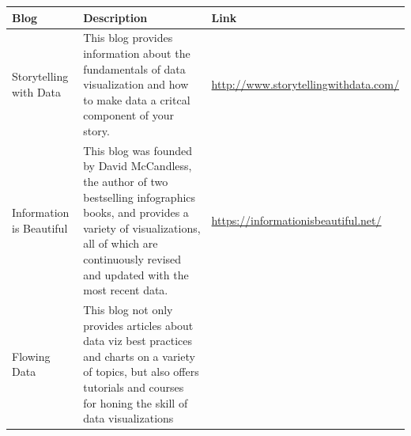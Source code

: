 \documentclass[]{book}
\theoremstyle{definition}
\theoremstyle{definition}
\theoremstyle{definition}
\theoremstyle{remark}
\begin{document}
\begin{longtable}[]{@{}lll@{}}
\toprule
\begin{minipage}[b]{0.11\columnwidth}\raggedright\strut
\textbf{Blog}\strut
\end{minipage} & \begin{minipage}[b]{0.20\columnwidth}\raggedright\strut
\textbf{Description}\strut
\end{minipage} & \begin{minipage}[b]{0.11\columnwidth}\raggedright\strut
\textbf{Link}\strut
\end{minipage}\tabularnewline
\midrule
\endhead
\begin{minipage}[t]{0.11\columnwidth}\raggedright\strut
Storytelling with Data\strut
\end{minipage} & \begin{minipage}[t]{0.20\columnwidth}\raggedright\strut
This blog provides information about the fundamentals of data
visualization and how to make data a critcal component of your
story.\strut
\end{minipage} & \begin{minipage}[t]{0.11\columnwidth}\raggedright\strut
\url{http://www.storytellingwithdata.com/}\strut
\end{minipage}\tabularnewline
\begin{minipage}[t]{0.11\columnwidth}\raggedright\strut
Information is Beautiful\strut
\end{minipage} & \begin{minipage}[t]{0.20\columnwidth}\raggedright\strut
This blog was founded by David McCandless, the author of two bestselling
infographics books, and provides a variety of visualizations, all of
which are continuously revised and updated with the most recent
data.\strut
\end{minipage} & \begin{minipage}[t]{0.11\columnwidth}\raggedright\strut
\url{https://informationisbeautiful.net/}\strut
\end{minipage}\tabularnewline
\begin{minipage}[t]{0.11\columnwidth}\raggedright\strut
Flowing Data\strut
\end{minipage} & \begin{minipage}[t]{0.20\columnwidth}\raggedright\strut
This blog not only provides articles about data viz best practices and
charts on a variety of topics, but also offers tutorials and courses for
honing the skill of data visualizations\strut
\end{minipage} & \begin{minipage}[t]{0.11\columnwidth}\raggedright\strut

\end{minipage}
\end{longtable}
\end{document}
